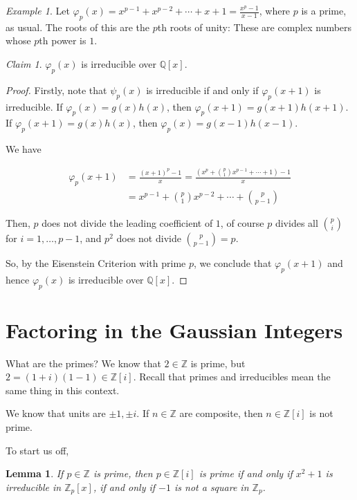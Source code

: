 \documentclass[12pt]{article}
\def\phi{\varphi}
\def\Z{{\mathbb Z}}
\def\Q{{\mathbb Q}}
\newtheorem{lemma}[theorem]{Lemma} %
\theoremstyle{remark}
\theoremstyle{remark}
\newtheorem{claim}{Claim}
\theoremstyle{remark}
\newtheorem{example}{Example}
\theoremstyle{remark}
\theoremstyle{remark}
\begin{document}
\begin{example}
  Let $\phi_p(x) = x^{p - 1} + x^{p - 2} + \cdots + x + 1 = \frac{x^p - 1}{x -
  1}$, where $p$ is a prime, as usual. The roots of this are the $p$th roots of
  unity: These are complex numbers whose $p$th power is $1$.

  \begin{claim}
    $\phi_p(x)$ is irreducible over $\Q[x]$.
  \end{claim}
  \begin{proof}
    Firstly, note that $\psi_p(x)$ is irreducible if and only if $\phi_p(x + 1)$
    is irreducible. If $\phi_p(x) = g(x)h(x)$, then $\phi_p(x + 1) = g(x + 1)h(x
    + 1)$. If $\phi_p(x + 1) = g(x)h(x)$, then $\phi_p(x) = g(x - 1)h(x - 1)$.

    We have

    \begin{align*}
      \phi_p(x + 1) &= \frac{(x + 1)^p - 1}{x} = \frac{(x^p + \binom{p}{1} x^{p - 1} + \cdots + 1) - 1}{x} \\
                    &= x^{p - 1} + \binom{p}{1}x^{p - 2} + \cdots + \binom{p}{p - 1}
    \end{align*}

    Then, $p$ does not divide the leading coefficient of $1$, of course $p$
    divides all $\binom{p}{i}$ for $i = 1, \dots, p - 1$, and $p^2$ does not
    divide $\binom{p}{p - 1} = p$.

    So, by the Eisenstein Criterion with prime $p$, we conclude that $\phi_p(x +
    1)$ and hence $\phi_p(x)$ is irreducible over $\Q[x]$.
  \end{proof}
\end{example}

\section{Factoring in the Gaussian Integers}

What are the primes? We know that $2 \in \Z$ is prime, but $2 = (1 + i)(1 - 1)
\in \Z[i]$. Recall that primes and irreducibles mean the same thing in this
context.

We know that units are $\pm 1, \pm i$. If $n \in \Z$ are composite, then $n \in
\Z[i]$ is not prime.

To start us off,

\begin{lemma}
  If $p \in \Z$ is prime, then $p \in \Z[i]$ is prime if and only if $x^2 + 1$
  is irreducible in $\Z_p[x]$, if and only if $-1$ is not a square in $\Z_p$.
\end{lemma}
\end{document}
